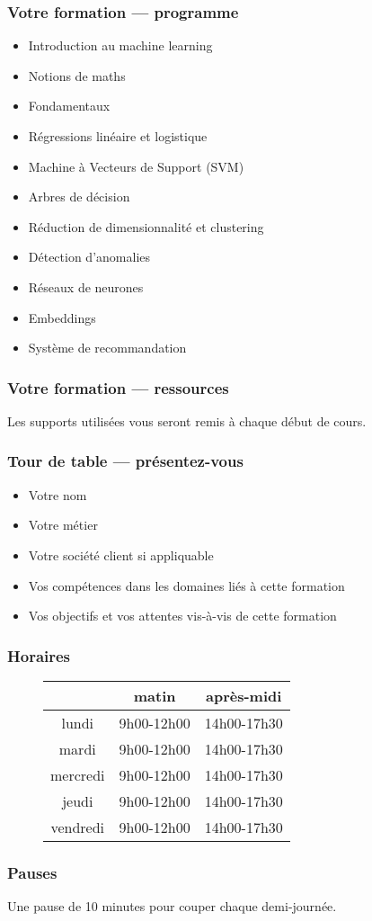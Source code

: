 \documentclass{formation}
\begin{document}
\begin{frame}
  \frametitle{Votre formation — programme}

  \begin{itemize}

  \item Introduction au machine learning
  \item Notions de maths
  \item Fondamentaux

  \item Régressions linéaire et logistique
  \item Machine à Vecteurs de Support (SVM)
  \item Arbres de décision

  \item Réduction de dimensionnalité et clustering
  \item Détection d'anomalies

  \item Réseaux de neurones
  \item Embeddings

  \item Système de recommandation
  \end{itemize}
\end{frame}

\begin{frame}
  \frametitle{Votre formation — ressources}
  Les supports utilisées vous seront remis à chaque début de cours.
\end{frame}

\begin{frame}
  \frametitle{Tour de table — présentez-vous}
  \begin{itemize}
  \item Votre nom
  \item Votre métier
  \item Votre société client si appliquable
  \item Vos compétences dans les domaines liés à cette formation
  \item Vos objectifs et vos attentes vis-à-vis de cette formation
  \end{itemize}
\end{frame}

\begin{frame}
  \frametitle{Horaires}
  \begin{figure}
    \centering
    \begin{tabular}{ccc}
      \toprule
               & matin            & après-midi        \\ \midrule
      lundi    & 9h00-12h00       & 14h00-17h30       \\
      mardi    & 9h00-12h00       & 14h00-17h30       \\
      mercredi & 9h00-12h00       & 14h00-17h30       \\
      jeudi    & 9h00-12h00       & 14h00-17h30       \\
      vendredi & 9h00-12h00       & 14h00-17h30       \\
      \bottomrule
    \end{tabular}
  \end{figure}
\end{frame}

\begin{frame}
  \frametitle{Pauses}
  Une pause de 10 minutes pour couper chaque demi-journée.
\end{frame}
\end{document}
